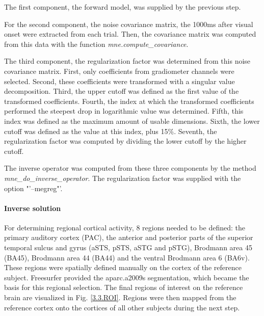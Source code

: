 The first component, the forward model, was supplied by the previous step.

For the second component, the noise covariance matrix, the 1000ms after visual onset were extracted from each trial.
Then, the covariance matrix was computed from this data with the function \emph{mne.compute\_covariance}.

The third component, the regularization factor was determined from this noise covariance matrix.
First, only coefficients from gradiometer channels were selected.
Second, these coefficients were transformed with a singular value decomposition.
Third, the upper cutoff was defined as the first value of the transformed coefficients.
Fourth, the index at which the transformed coefficients performed the steepest drop in logarithmic value was determined.
Fifth, this index was defined as the maximum amount of usable dimensions.
Sixth, the lower cutoff was defined as the value at this index, plus 15\%.
Seventh, the regularization factor was computed by dividing the lower cutoff by the higher cutoff.


The inverse operator was computed from these three components by the method \linebreak \emph{mne\_do\_inverse\_operator}.
The regularization factor was supplied with the option \linebreak "'--megreg"'.

\paragraph{Inverse solution}
For determining regional cortical activity, 8 regions needed to be defined: the primary auditory cortex (PAC), the anterior and posterior parts of the superior temporal sulcus and gyrus (aSTS, pSTS, aSTG and pSTG), Brodmann area 45 (BA45), Brodmann area 44 (BA44) and the ventral Brodmann area 6 (BA6v).
These regions were spatially defined manually on the cortex of the reference subject.
Freesurfer provided the aparc.a2009s segmentation, which became the basis for this regional selection.
The final regions of interest on the reference brain are visualized in Fig. \ref{3.3.ROI}.
Regions were then mapped from the reference cortex onto the cortices of all other subjects during the next step.

